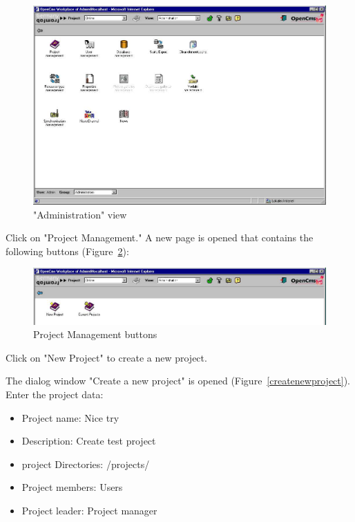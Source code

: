 \begin{figure}[h]
\begin{center}
\includegraphics[width=\sgw]
                   {pics/usermanual/adminView}
\caption["Administration" view]
           {"Administration" view}
\label{adminview}
\end{center}
\end{figure}

Click on "Project Management." A new page is opened that contains
the following buttons (Figure~\ref{projectmanager}):

\begin{figure}[h]
\begin{center}
\includegraphics[width=\sgw]
                   {pics/usermanual/projectManager}
\caption[Project Management buttons]
           {Project Management buttons}
\label{projectmanager}
\end{center}
\end{figure}

Click on "New Project" to create a new project.

The dialog window "Create a new project" is opened
(Figure~\ref{createnewproject}). Enter the project data:

\begin{itemize}
\item Project name: Nice try
\item Description: Create test project
\item project Directories: /projects/
\item Project members: Users
\item Project leader: Project manager
\end{itemize}

